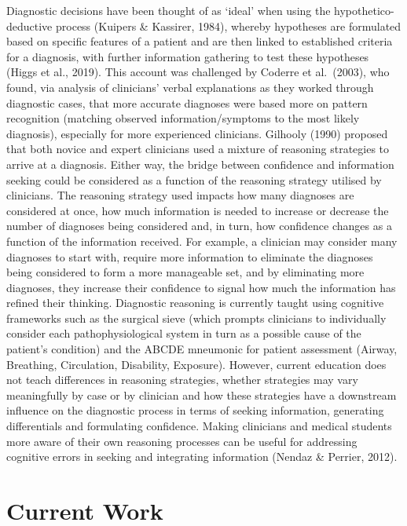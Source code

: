 \documentclass[a4paper, nobind]{templates/ociamthesis}
\begin{document}
\hfill\break
Diagnostic decisions have been thought of as `ideal' when using the hypothetico-deductive process (Kuipers \& Kassirer, 1984), whereby hypotheses are formulated based on specific features of a patient and are then linked to established criteria for a diagnosis, with further information gathering to test these hypotheses (Higgs et al., 2019). This account was challenged by Coderre et al.~(2003), who found, via analysis of clinicians' verbal explanations as they worked through diagnostic cases, that more accurate diagnoses were based more on pattern recognition (matching observed information/symptoms to the most likely diagnosis), especially for more experienced clinicians. Gilhooly (1990) proposed that both novice and expert clinicians used a mixture of reasoning strategies to arrive at a diagnosis. Either way, the bridge between confidence and information seeking could be considered as a function of the reasoning strategy utilised by clinicians. The reasoning strategy used impacts how many diagnoses are considered at once, how much information is needed to increase or decrease the number of diagnoses being considered and, in turn, how confidence changes as a function of the information received. For example, a clinician may consider many diagnoses to start with, require more information to eliminate the diagnoses being considered to form a more manageable set, and by eliminating more diagnoses, they increase their confidence to signal how much the information has refined their thinking. Diagnostic reasoning is currently taught using cognitive frameworks such as the surgical sieve (which prompts clinicians to individually consider each pathophysiological system in turn as a possible cause of the patient's condition) and the ABCDE mneumonic for patient assessment (Airway, Breathing, Circulation, Disability, Exposure). However, current education does not teach differences in reasoning strategies, whether strategies may vary meaningfully by case or by clinician and how these strategies have a downstream influence on the diagnostic process in terms of seeking information, generating differentials and formulating confidence. Making clinicians and medical students more aware of their own reasoning processes can be useful for addressing cognitive errors in seeking and integrating information (Nendaz \& Perrier, 2012).

\section*{Current Work}\label{current-work}
\end{document}
